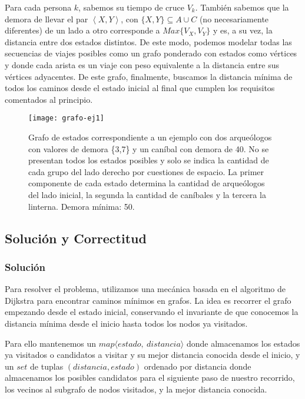        Para cada persona $k$, sabemos su tiempo de cruce $V_k$. También sabemos que la demora de llevar el par $\left \langle {X, Y} \right \rangle$, con $\{X,Y\} \subseteq A \cup C$ (no necesariamente diferentes) de un lado a otro corresponde a $Max\{ V_{X}, V_{Y}  \}$ y es, a su vez, la distancia entre dos estados distintos. De este modo, podemos modelar todas las secuencias de viajes posibles como un grafo ponderado con estados como vértices y donde cada arista es un viaje con peso equivalente a la distancia entre sus vértices adyacentes. De este grafo, finalmente, buscamos la distancia mínima de todos los caminos desde el estado inicial al final que cumplen los requisitos comentados al principio.
        \\
        
\begin{figure}[H]
    \centering
    \texttt{[image: grafo-ej1]}
    \caption{Grafo de estados correspondiente a un ejemplo con dos arqueólogos con valores de demora \{3,7\} y un caníbal con demora de 40. No se presentan todos los estados posibles y solo se indica la cantidad de cada grupo del lado derecho por cuestiones de espacio. La primer componente de cada estado determina la cantidad de arqueólogos del lado inicial, la segunda la cantidad de caníbales y la tercera la linterna. Demora mínima: 50.}
    \label{fig:ej1-graph}
\end{figure}


\subsection{Solución y Correctitud}
    \subsubsection{Solución}

    Para resolver el problema, utilizamos una mecánica basada en el algoritmo de Dijkstra para encontrar caminos mínimos en grafos. La idea es recorrer el grafo empezando desde el estado inicial, conservando el invariante de que conocemos la distancia mínima desde el inicio hasta todos los nodos ya visitados.

    Para ello mantenemos un $map\langle {estado,\ distancia} \rangle$ donde almacenamos los estados ya visitados o candidatos a visitar y su mejor distancia conocida desde el inicio, y un $set$ de tuplas $(distancia, estado)$ ordenado por distancia donde almacenamos los posibles candidatos para el siguiente paso de nuestro recorrido, los vecinos al subgrafo de nodos visitados, y la mejor distancia conocida.

